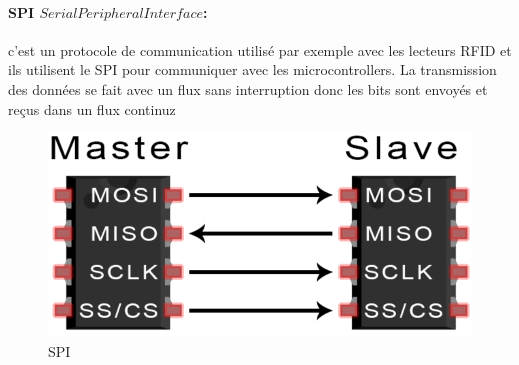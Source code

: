 \paragraph{SPI \(Serial Peripheral Interface\):} c'est un protocole de communication utilisé par exemple avec les lecteurs RFID et ils utilisent le SPI pour communiquer avec les microcontrollers. La transmission des données se fait avec un flux sans interruption donc les bits sont envoyés et reçus dans un flux continuz\\
\begin{figure}[h!]
   \centering
   \includegraphics[width=.5\textwidth]{images/spi.png}
   \caption{SPI}
\end{figure}

